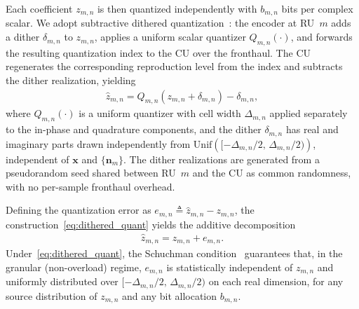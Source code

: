 \documentclass[10pt, twocolumn, comsoc]{IEEEtran}
\begin{document}
Each coefficient $z_{m,n}$ is then quantized independently with $b_{m,n}$ bits per complex scalar. We adopt subtractive dithered quantization~\cite{schuchman1964dither}: the encoder at RU~$m$ adds a dither $\delta_{m,n}$ to $z_{m,n}$, applies a uniform scalar quantizer $Q_{m,n}(\cdot)$, and forwards the resulting quantization index to the CU over the fronthaul. 
The CU regenerates the corresponding reproduction level from the index and subtracts the dither realization, yielding
\begin{align}\label{eq:dithered_quant}
  \hat{z}_{m,n} = Q_{m,n}\!\left(z_{m,n} + \delta_{m,n}\right) - \delta_{m,n},
\end{align}
where $Q_{m,n}(\cdot)$ is a uniform quantizer with cell width $\Delta_{m,n}$ applied separately to the in-phase and quadrature components, and the dither $\delta_{m,n}$ has real and imaginary parts drawn independently from $\mathrm{Unif}\left([-\Delta_{m,n}/2,\,\Delta_{m,n}/2)\right)$, independent of $\mathbf{x}$ and $\{\mathbf{n}_m\}$.
The dither realizations are generated from a pseudorandom seed shared between RU~$m$ and the CU as common randomness, with no per-sample fronthaul overhead.


Defining the quantization error as $e_{m,n} \triangleq \hat{z}_{m,n} - z_{m,n}$, the construction~\eqref{eq:dithered_quant} yields the additive decomposition
\begin{align} \label{eq:additive_decomp}
  \hat{z}_{m,n} = z_{m,n} + e_{m,n}.
\end{align}
Under~\eqref{eq:dithered_quant}, the Schuchman condition~\cite{schuchman1964dither} guarantees that, in the granular (non-overload) regime, $e_{m,n}$ is statistically independent of $z_{m,n}$ and uniformly distributed over $[-\Delta_{m,n}/2,\,\Delta_{m,n}/2)$ on each real dimension, for any source distribution of $z_{m,n}$ and any bit allocation $b_{m,n}$.
\end{document}
